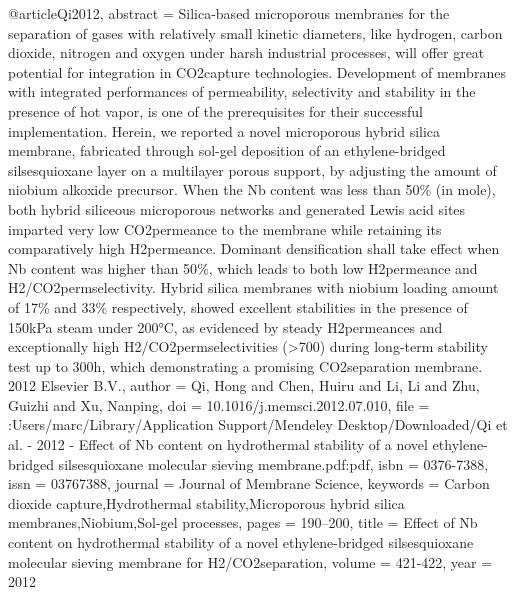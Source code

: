 @article{Qi2012,
abstract = {Silica-based microporous membranes for the separation of gases with relatively small kinetic diameters, like hydrogen, carbon dioxide, nitrogen and oxygen under harsh industrial processes, will offer great potential for integration in CO2capture technologies. Development of membranes with integrated performances of permeability, selectivity and stability in the presence of hot vapor, is one of the prerequisites for their successful implementation. Herein, we reported a novel microporous hybrid silica membrane, fabricated through sol-gel deposition of an ethylene-bridged silsesquioxane layer on a multilayer porous support, by adjusting the amount of niobium alkoxide precursor. When the Nb content was less than 50{\%} (in mole), both hybrid siliceous microporous networks and generated Lewis acid sites imparted very low CO2permeance to the membrane while retaining its comparatively high H2permeance. Dominant densification shall take effect when Nb content was higher than 50{\%}, which leads to both low H2permeance and H2/CO2permselectivity. Hybrid silica membranes with niobium loading amount of 17{\%} and 33{\%} respectively, showed excellent stabilities in the presence of 150kPa steam under 200°C, as evidenced by steady H2permeances and exceptionally high H2/CO2permselectivities ({\textgreater}700) during long-term stability test up to 300h, which demonstrating a promising CO2separation membrane. {\textcopyright} 2012 Elsevier B.V.},
author = {Qi, Hong and Chen, Huiru and Li, Li and Zhu, Guizhi and Xu, Nanping},
doi = {10.1016/j.memsci.2012.07.010},
file = {:Users/marc/Library/Application Support/Mendeley Desktop/Downloaded/Qi et al. - 2012 - Effect of Nb content on hydrothermal stability of a novel ethylene-bridged silsesquioxane molecular sieving membrane.pdf:pdf},
isbn = {0376-7388},
issn = {03767388},
journal = {Journal of Membrane Science},
keywords = {Carbon dioxide capture,Hydrothermal stability,Microporous hybrid silica membranes,Niobium,Sol-gel processes},
pages = {190--200},
title = {{Effect of Nb content on hydrothermal stability of a novel ethylene-bridged silsesquioxane molecular sieving membrane for H2/CO2separation}},
volume = {421-422},
year = {2012}
}
